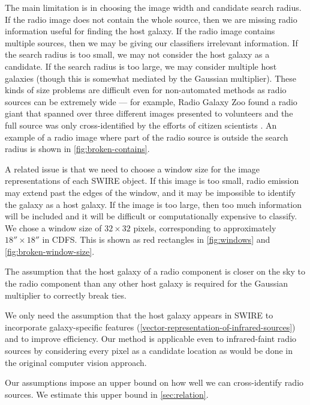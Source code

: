 \documentclass[fleqn,usenatbib,usedcolumn]{mnras}
\begin{document}
    The main limitation is in choosing the image width and candidate search
    radius. If the radio image does not contain the whole source, then we are
    missing radio information useful for finding the host galaxy. If the radio
    image contains multiple sources, then we may be giving our classifiers
    irrelevant information. If the search radius is too small, we may not
    consider the host galaxy as a candidate. If the search radius is too
    large, we may consider multiple host galaxies (though this is somewhat
    mediated by the Gaussian multiplier). These kinds of size problems are
    difficult even for non-automated methods as radio sources can be extremely
    wide --- for example, Radio Galaxy Zoo found a radio giant that spanned
    over three different images presented to volunteers and the full source
    was only cross-identified by the efforts of citizen scientists
    \citep{banfield15}. An example of a radio image where part of the radio
    source is outside the search radius is shown in
    \autoref{fig:broken-contains}.

    A related issue is that we need to choose a window size for the image
    representations of each SWIRE object. If this image is too small, radio
    emission may extend past the edges of the window, and it may be impossible
    to identify the galaxy as a host galaxy. If the image is too large, then
    too much information will be included and it will be difficult or
    computationally expensive to classify. We chose a window size of $32
    \times 32$ pixels, corresponding to approximately $18'' \times 18''$ in
    CDFS. This is shown as red rectangles in \autoref{fig:windows} and
    \autoref{fig:broken-window-size}.

    The assumption that the host galaxy of a radio component is closer on the
    sky to the radio component than any other host galaxy is required for the
    Gaussian multiplier to correctly break ties.

    We only need the assumption that the host galaxy appears in SWIRE to
    incorporate galaxy-specific features
    (\autoref{vector-representation-of-infrared-sources}) and to improve
    efficiency. Our method is applicable even to infrared-faint radio sources
    by considering every pixel as a candidate location as would be done in the
    original computer vision approach.

    Our assumptions impose an upper bound on how well we can cross-identify
    radio sources. We estimate this upper bound in \autoref{sec:relation}.
\end{document}
